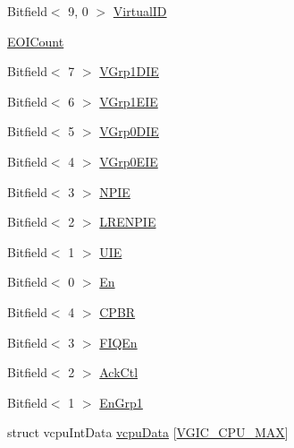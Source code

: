 \begin{DoxyCompactItemize}
Bitfield$<$ 9, 0 $>$ \hyperlink{classVGic_a309cc4782346e985de8920752d7caf2a}{VirtualID}
\item 
\hyperlink{classVGic_a76289f30955e28466cc690ccf6001e61}{EOICount}
\item 
Bitfield$<$ 7 $>$ \hyperlink{classVGic_a3055f44714481212195dd4c9b77302ee}{VGrp1DIE}
\item 
Bitfield$<$ 6 $>$ \hyperlink{classVGic_ad5d876b0f8095008474757f67bf975e4}{VGrp1EIE}
\item 
Bitfield$<$ 5 $>$ \hyperlink{classVGic_affc0c4742ef1d61df5a0e8e8b2cee33b}{VGrp0DIE}
\item 
Bitfield$<$ 4 $>$ \hyperlink{classVGic_a76012350e6bb46dfdc7240afc726d949}{VGrp0EIE}
\item 
Bitfield$<$ 3 $>$ \hyperlink{classVGic_aa24f9f3124265bcdf1cea24165b2b0b9}{NPIE}
\item 
Bitfield$<$ 2 $>$ \hyperlink{classVGic_ab0faa2c980aa53ef7c92002af04c332b}{LRENPIE}
\item 
Bitfield$<$ 1 $>$ \hyperlink{classVGic_a0adbea6aeb62d30f03ddc9a25fe11b40}{UIE}
\item 
Bitfield$<$ 0 $>$ \hyperlink{classVGic_a6c33fee90de41b22938ac6bf2bbf0b37}{En}
\item 
Bitfield$<$ 4 $>$ \hyperlink{classVGic_a08a6b10064e3d9e0c614063665d33c54}{CPBR}
\item 
Bitfield$<$ 3 $>$ \hyperlink{classVGic_afa8693ab3b402c4d83774143fa804e3b}{FIQEn}
\item 
Bitfield$<$ 2 $>$ \hyperlink{classVGic_a66b61167f5695385dad02f2b536d0184}{AckCtl}
\item 
Bitfield$<$ 1 $>$ \hyperlink{classVGic_abd1b3356359eb92893a437944f5a292f}{EnGrp1}
\item 
struct vcpuIntData \hyperlink{classVGic_a98b5031733bb2cb7d20cf68a3a1ac460}{vcpuData} \mbox{[}\hyperlink{classVGic_abdf6630d700683c52d9cd03f11d660ac}{VGIC\_\-CPU\_\-MAX}\mbox{]}
\end{DoxyCompactItemize}
